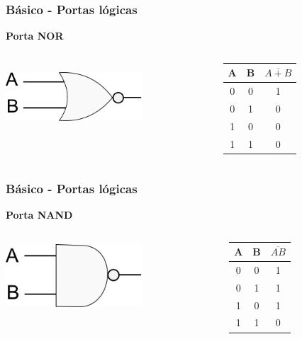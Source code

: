 \documentclass{beamer}
\begin{document}
\begin{frame}
  \frametitle{Básico - Portas lógicas}
\begin{center}
   \textbf{\huge{Porta NOR}} 
   \begin{columns}[c]
   \begin{column}{5cm}
    \includegraphics[height = 1in, width = 2in]{nor.png}
   \end{column}\pause
   \begin{column}{5cm}
    \begin{tabular}{|c|c|c|}
     \hline
     A & B & $\overline{A + B}$ \\
     \hline	
     0 & 0 & 1 \\
     0 & 1 & 0 \\
     1 & 0 & 0 \\
     1 & 1 & 0 \\ 
     \hline
    \end{tabular}
   \end{column}

  \end{columns}
\end{center}
\end{frame}

\begin{frame}
  \frametitle{Básico - Portas lógicas}
\begin{center}
   \textbf{\huge{Porta NAND}} 
   \begin{columns}[c]
   \begin{column}{5cm}
    \includegraphics[height = 1in, width = 2in]{nand.png}
   \end{column}\pause
   \begin{column}{5cm}
    \begin{tabular}{|c|c|c|}
     \hline
     A & B & $\overline{AB}$ \\
     \hline	
     0 & 0 & 1 \\
     0 & 1 & 1 \\
     1 & 0 & 1 \\
     1 & 1 & 0 \\ 
     \hline
    \end{tabular}
   \end{column}

  \end{columns}
\end{center}
\end{frame}
\end{document}
